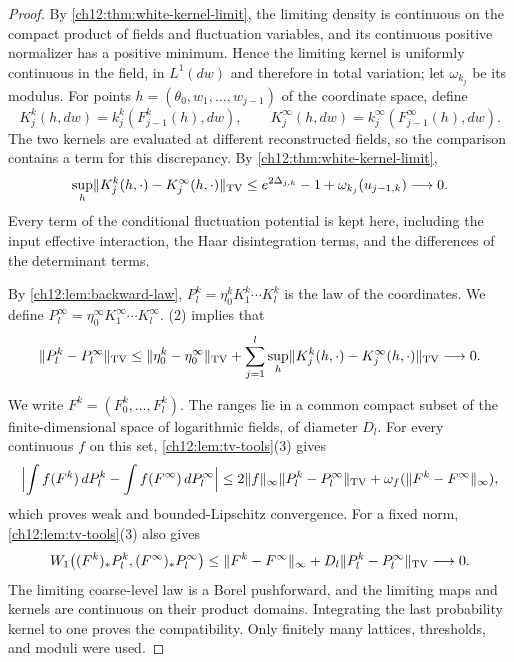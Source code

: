 \begin{proof}
By \cref{ch12:thm:white-kernel-limit}, the limiting density is continuous on the compact product of fields and fluctuation variables, and its continuous positive normalizer has a positive minimum. Hence the limiting kernel is uniformly continuous in the field, in $L^1(dw)$ and therefore in total variation; let $\omega_{k_j}$ be its modulus. For points $h=(\theta_0,w_1,\ldots,w_{j-1})$ of the coordinate space, define
\[
 K_j^k(h,dw)=k_j^k(F_{j-1}^k(h),dw),\qquad K_j^\infty(h,dw)=k_j^\infty(F_{j-1}^\infty(h),dw).
\]
The two kernels are evaluated at different reconstructed fields, so the comparison contains a term for this discrepancy. By \cref{ch12:thm:white-kernel-limit},
\begin{equation}\label{ch12:eq:calculation-26}
 \sup_h\lVert K_j^k(h,\cdot)-K_j^\infty(h,\cdot)\rVert_{\operatorname{TV}}\le e^{2\Delta_{j,k}}-1+\omega_{k_j}(u_{j-1,k})\longrightarrow0 .
\end{equation}
Every term of the conditional fluctuation potential is kept here, including the input effective interaction, the Haar disintegration terms, and the differences of the determinant terms.

By \cref{ch12:lem:backward-law}, $P_l^k=\eta_0^kK_1^k\cdots K_l^k$ is the law of the coordinates. We define $P_l^\infty=\eta_0^\infty K_1^\infty\cdots K_l^\infty$. (2) implies that
\begin{equation}\label{ch12:eq:coordinate-tv}
 \lVert P_l^k-P_l^\infty\rVert_{\operatorname{TV}}\le\lVert \eta_0^k-\eta_0^\infty\rVert_{\operatorname{TV}}+\sum_{j=1}^l\sup_h\lVert K_j^k(h,\cdot)-K_j^\infty(h,\cdot)\rVert_{\operatorname{TV}}\longrightarrow0 .
\end{equation}

We write $F^k=(F_0^k,\ldots,F_l^k)$. The ranges lie in a common compact subset of the finite-dimensional space of logarithmic fields, of diameter $D_l$. For every continuous $f$ on this set, \cref{ch12:lem:tv-tools}(3) gives
\begin{equation}\label{ch12:eq:calculation-28}
 \Bigl\lvert\int f(F^k)\,dP_l^k-\int f(F^\infty)\,dP_l^\infty\Bigr\rvert\le2\lVert f\rVert_\infty\lVert P_l^k-P_l^\infty\rVert_{\operatorname{TV}}+\omega_f(\lVert F^k-F^\infty\rVert_\infty),
\end{equation}
which proves weak and bounded-Lipschitz convergence. For a fixed norm, \cref{ch12:lem:tv-tools}(3) also gives
\[
 W_1\bigl((F^k)_*P_l^k,(F^\infty)_*P_l^\infty\bigr)\le\lVert F^k-F^\infty\rVert_\infty+D_l\lVert P_l^k-P_l^\infty\rVert_{\operatorname{TV}}\longrightarrow0 .
\]
The limiting coarse-level law is a Borel pushforward, and the limiting maps and kernels are continuous on their product domains. Integrating the last probability kernel to one proves the compatibility. Only finitely many lattices, thresholds, and moduli were used.
\end{proof}

